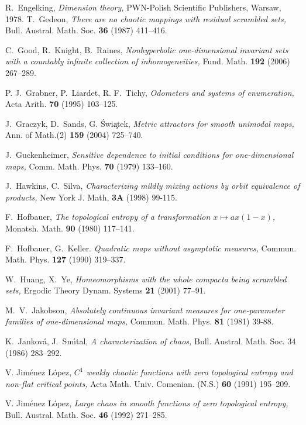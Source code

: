 \documentclass[12pt, psamsfonts, reqno]{amsart}
\begin{document}
\begin{thebibliography}{BKNS}
 R.\ Engelking,
{\em Dimension theory,} PWN-Polish Scientific Publishers, Warsaw,
1978.
 T.\ Gedeon,
{\em There are no chaotic mappings with residual scrambled sets,}
Bull. Austral. Math. Soc. {\bf 36} (1987) 411--416.

 C.\ Good, R.\ Knight, B.\ Raines,
{\em Nonhyperbolic one-dimensional invariant sets with a countably
infinite collection of inhomogeneities,} Fund. Math. {\bf 192}
(2006) 267--289.

 P. J.\ Grabner, P.\ Liardet, R. F.\ Tichy,
{\em Odometers and systems of enumeration,} Acta Arith. {\bf 70}
(1995) 103--125.

 J.\ Graczyk, D.\ Sands, G. \'Swi\c atek,
{\em Metric attractors for smooth unimodal maps,} Ann. of Math.(2)
{\bf 159} (2004) 725--740.

 J.\ Guckenheimer, {\em Sensitive dependence to
initial conditions for one-dimensional maps,}  Comm. Math. Phys.
{\bf 70} (1979) 133--160.

 J.\ Hawkins, C.\ Silva,
{\em Characterizing mildly mixing actions by orbit equivalence of
products,} New York J. Math, {\bf 3A} (1998) 99-115.

 F.\ Hofbauer,
{\em The topological entropy of a transformation $x \mapsto
ax(1-x)$,} Monatsh. Math. {\bf 90} (1980) 117--141.

 F.\ Hofbauer, G.\ Keller.
{\em Quadratic maps without asymptotic measures,} Commun. Math.
Phys. {\bf 127} (1990) 319--337.

 W.\ Huang, X.\ Ye, {\em Homeomorphisms with
the whole compacta being scrambled sets,} Ergodic Theory Dynam.
Systems {\bf 21} (2001) 77--91.

 M.\ V.\ Jakobson,
{\em Absolutely continuous invariant measures for one-parameter
families of one-dimensional maps,}
Commun. Math. Phys. {\bf 81} (1981) 39-88.

 K.\ Jankov\'a, J.\ Sm\'{\i}tal,
{\em A characterization of chaos,}  Bull. Austral. Math. Soc.
{\bf} 34 (1986) 283--292.

 V. Jim\'enez L\'opez, {\em $C^1$ weakly chaotic
functions with zero topological entropy and non-flat critical
points,} Acta Math. Univ. Comenian. (N.S.) {\bf 60} (1991)
195--209.

 V. Jim\'enez L\'opez, {\em  Large chaos in
smooth functions of zero topological entropy,} Bull. Austral.
Math. Soc. {\bf 46} (1992) 271--285.


\end{thebibliography}
\end{document}
